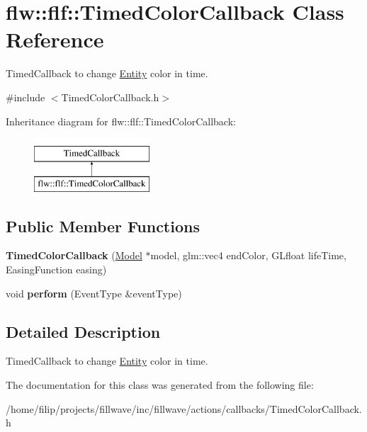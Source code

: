 \hypertarget{classflw_1_1flf_1_1TimedColorCallback}{}\section{flw\+:\+:flf\+:\+:Timed\+Color\+Callback Class Reference}
\label{classflw_1_1flf_1_1TimedColorCallback}


Timed\+Callback to change \hyperlink{classflw_1_1flf_1_1Entity}{Entity} color in time.  




{\ttfamily \#include $<$Timed\+Color\+Callback.\+h$>$}

Inheritance diagram for flw\+:\+:flf\+:\+:Timed\+Color\+Callback\+:\begin{figure}[H]
\begin{center}
\leavevmode
\includegraphics[height=2.000000cm]{classflw_1_1flf_1_1TimedColorCallback}
\end{center}
\end{figure}
\subsection*{Public Member Functions}
\begin{DoxyCompactItemize}
\item 
\mbox{\label{classflw_1_1flf_1_1TimedColorCallback_a23aef1c8dd9cac1bc7c4cb207190611c}} 
{\bfseries Timed\+Color\+Callback} (\hyperlink{classflw_1_1flf_1_1Model}{Model} $\ast$model, glm\+::vec4 end\+Color, G\+Lfloat life\+Time, Easing\+Function easing)
\item 
\mbox{\label{classflw_1_1flf_1_1TimedColorCallback_a6f967da4303f77cbba5be0f4e958ae5d}} 
void {\bfseries perform} (Event\+Type \&event\+Type)
\end{DoxyCompactItemize}


\subsection{Detailed Description}
Timed\+Callback to change \hyperlink{classflw_1_1flf_1_1Entity}{Entity} color in time. 

The documentation for this class was generated from the following file\+:\begin{DoxyCompactItemize}
\item 
/home/filip/projects/fillwave/inc/fillwave/actions/callbacks/Timed\+Color\+Callback.\+h\end{DoxyCompactItemize}
